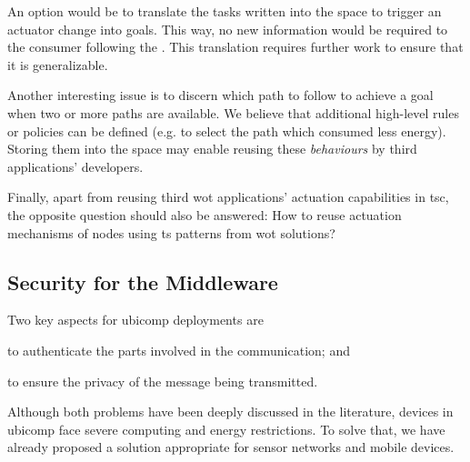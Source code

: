 An option would be to translate the tasks written into the space to trigger an actuator change into goals.
This way, no new information would be required to the consumer following the \spaceActuation{}.
This translation requires further work to ensure that it is generalizable.

% 
Another interesting issue is to discern which path to follow to achieve a goal when two or more paths are available.
We believe that additional high-level rules or policies can be defined (e.g. to select the path which consumed less energy).
Storing them into the space may enable reusing these \emph{behaviours} by third applications' developers.

Finally, apart from reusing third \ac{wot} applications' actuation capabilities in \ac{tsc}, the opposite question should also be answered:
How to reuse actuation mechanisms of nodes using \ac{ts} patterns from \ac{wot} solutions?


\subsection{Security for the Middleware}

Two key aspects for \ac{ubicomp} deployments are
\begin{enumerate*}[label=\itshape(\arabic*\upshape)]
  \item to authenticate the parts involved in the communication; and
  \item to ensure the privacy of the message being transmitted.
\end{enumerate*}
Although both problems have been deeply discussed in the literature,
devices in \ac{ubicomp} face severe computing and energy restrictions.
To solve that, we have already proposed a solution appropriate for sensor networks and mobile devices.

